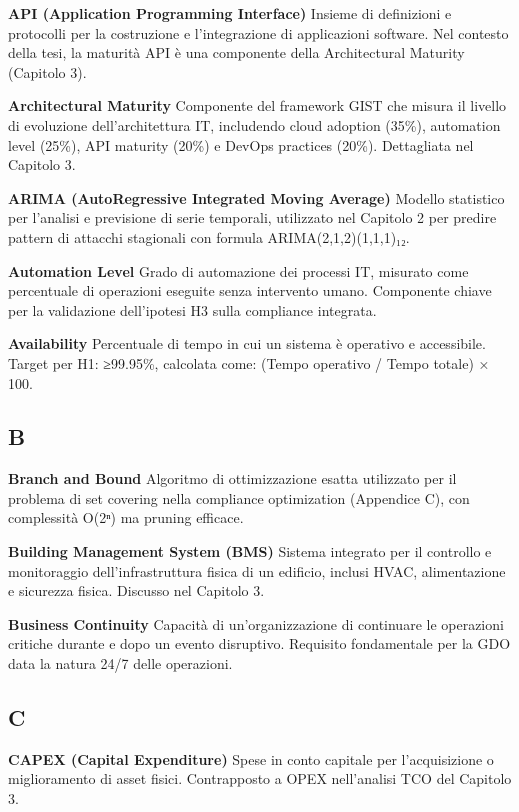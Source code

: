 \documentclass{report}
\begin{document}
\textbf{API (Application Programming Interface)} Insieme di definizioni
e protocolli per la costruzione e l'integrazione di applicazioni
software. Nel contesto della tesi, la maturità API è una componente
della Architectural Maturity (Capitolo 3).

\textbf{Architectural Maturity} Componente del framework GIST che misura
il livello di evoluzione dell'architettura IT, includendo cloud adoption
(35\%), automation level (25\%), API maturity (20\%) e DevOps practices
(20\%). Dettagliata nel Capitolo 3.

\textbf{ARIMA (AutoRegressive Integrated Moving Average)} Modello
statistico per l'analisi e previsione di serie temporali, utilizzato nel
Capitolo 2 per predire pattern di attacchi stagionali con formula
ARIMA(2,1,2)(1,1,1)₁₂.

\textbf{Automation Level} Grado di automazione dei processi IT, misurato
come percentuale di operazioni eseguite senza intervento umano.
Componente chiave per la validazione dell'ipotesi H3 sulla compliance
integrata.

\textbf{Availability} Percentuale di tempo in cui un sistema è operativo
e accessibile. Target per H1: ≥99.95\%, calcolata come: (Tempo operativo
/ Tempo totale) × 100.

\subsection{B}\label{b}

\textbf{Branch and Bound} Algoritmo di ottimizzazione esatta utilizzato
per il problema di set covering nella compliance optimization (Appendice
C), con complessità O(2ⁿ) ma pruning efficace.

\textbf{Building Management System (BMS)} Sistema integrato per il
controllo e monitoraggio dell'infrastruttura fisica di un edificio,
inclusi HVAC, alimentazione e sicurezza fisica. Discusso nel Capitolo 3.

\textbf{Business Continuity} Capacità di un'organizzazione di continuare
le operazioni critiche durante e dopo un evento disruptivo. Requisito
fondamentale per la GDO data la natura 24/7 delle operazioni.

\subsection{C}\label{c}

\textbf{CAPEX (Capital Expenditure)} Spese in conto capitale per
l'acquisizione o miglioramento di asset fisici. Contrapposto a OPEX
nell'analisi TCO del Capitolo 3.
\end{document}
